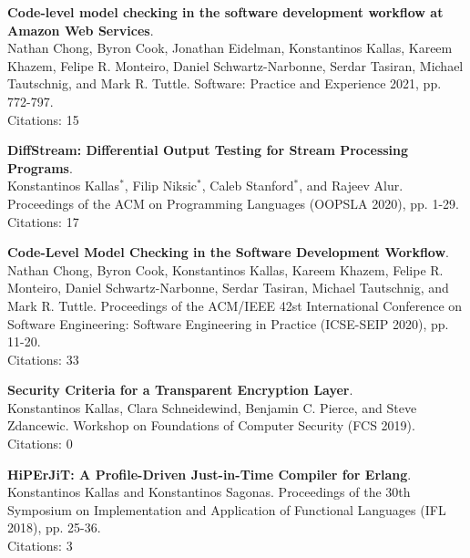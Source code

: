 \begin{minipage}{\textwidth}
\textbf{Code-level model checking in the software development workflow at Amazon Web Services}. \\
Nathan Chong, Byron Cook, Jonathan Eidelman, Konstantinos Kallas, Kareem Khazem, Felipe R. Monteiro, Daniel Schwartz-Narbonne, Serdar Tasiran, Michael Tautschnig, and Mark R. Tuttle.
Software: Practice and Experience 2021, pp. 772-797. \\
Citations: 15
\end{minipage}
    
\begin{minipage}{\textwidth}
\textbf{DiffStream: Differential Output Testing for Stream Processing Programs}. \\
Konstantinos Kallas$^*$, Filip Niksic$^*$, Caleb Stanford$^*$, and Rajeev Alur.
Proceedings of the ACM on Programming Languages (OOPSLA 2020), pp. 1-29. \\
Citations: 17
\end{minipage}

\begin{minipage}{\textwidth}
\textbf{Code-Level Model Checking in the Software Development Workflow}. \\
Nathan Chong, Byron Cook, Konstantinos Kallas, Kareem Khazem, Felipe R. Monteiro, Daniel Schwartz-Narbonne, Serdar Tasiran, Michael Tautschnig, and Mark R. Tuttle.
Proceedings of the ACM/IEEE 42st International Conference on Software Engineering: Software Engineering in Practice (ICSE-SEIP 2020), pp. 11-20. \\
Citations: 33
\end{minipage}

\begin{minipage}{\textwidth}
\textbf{Security Criteria for a Transparent Encryption Layer}. \\
Konstantinos Kallas, Clara Schneidewind, Benjamin C. Pierce, and Steve Zdancewic.
Workshop on Foundations of Computer Security (FCS 2019). \\
Citations: 0
\end{minipage}

\begin{minipage}{\textwidth}
\textbf{HiPErJiT: A Profile-Driven Just-in-Time Compiler for Erlang}. \\
Konstantinos Kallas and Konstantinos Sagonas.
Proceedings of the 30th Symposium on Implementation and Application of Functional Languages (IFL 2018), pp. 25-36. \\
Citations: 3
\end{minipage}


